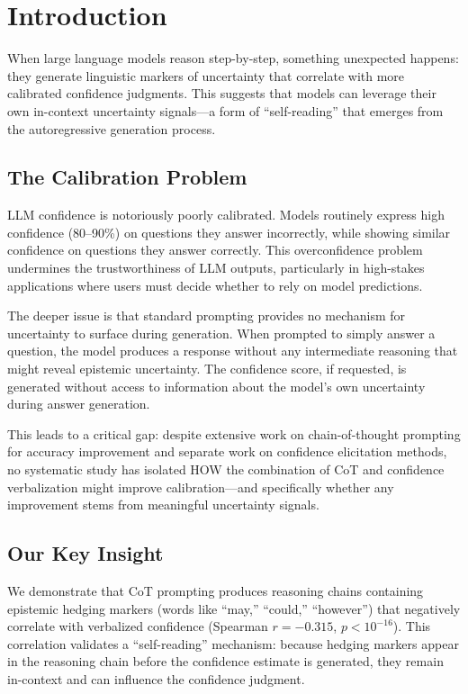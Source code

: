 \section{Introduction}

When large language models reason step-by-step, something unexpected happens: they generate linguistic markers of uncertainty that correlate with more calibrated confidence judgments. This suggests that models can leverage their own in-context uncertainty signals---a form of ``self-reading'' that emerges from the autoregressive generation process.

\subsection{The Calibration Problem}

LLM confidence is notoriously poorly calibrated. Models routinely express high confidence (80--90\%) on questions they answer incorrectly, while showing similar confidence on questions they answer correctly. This overconfidence problem undermines the trustworthiness of LLM outputs, particularly in high-stakes applications where users must decide whether to rely on model predictions.

The deeper issue is that standard prompting provides no mechanism for uncertainty to surface during generation. When prompted to simply answer a question, the model produces a response without any intermediate reasoning that might reveal epistemic uncertainty. The confidence score, if requested, is generated without access to information about the model's own uncertainty during answer generation.

This leads to a critical gap: despite extensive work on chain-of-thought prompting for accuracy improvement and separate work on confidence elicitation methods, no systematic study has isolated HOW the combination of CoT and confidence verbalization might improve calibration---and specifically whether any improvement stems from meaningful uncertainty signals.

\subsection{Our Key Insight}

We demonstrate that CoT prompting produces reasoning chains containing epistemic hedging markers (words like ``may,'' ``could,'' ``however'') that negatively correlate with verbalized confidence (Spearman $r=-0.315$, $p<10^{-16}$). This correlation validates a ``self-reading'' mechanism: because hedging markers appear in the reasoning chain before the confidence estimate is generated, they remain in-context and can influence the confidence judgment.

